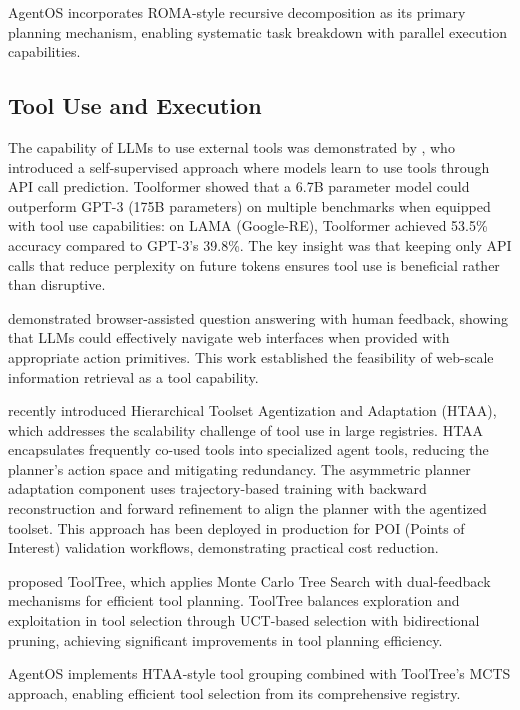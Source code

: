 \documentclass{article}
\begin{document}
AgentOS incorporates ROMA-style recursive decomposition as its primary planning mechanism, enabling systematic task breakdown with parallel execution capabilities.

\subsection{Tool Use and Execution}

The capability of LLMs to use external tools was demonstrated by \citet{schick2023toolformer}, who introduced a self-supervised approach where models learn to use tools through API call prediction. Toolformer showed that a 6.7B parameter model could outperform GPT-3 (175B parameters) on multiple benchmarks when equipped with tool use capabilities: on LAMA (Google-RE), Toolformer achieved 53.5\% accuracy compared to GPT-3's 39.8\%. The key insight was that keeping only API calls that reduce perplexity on future tokens ensures tool use is beneficial rather than disruptive.

\citet{nakano2021webgpt} demonstrated browser-assisted question answering with human feedback, showing that LLMs could effectively navigate web interfaces when provided with appropriate action primitives. This work established the feasibility of web-scale information retrieval as a tool capability.

\citet{htaa2026} recently introduced Hierarchical Toolset Agentization and Adaptation (HTAA), which addresses the scalability challenge of tool use in large registries. HTAA encapsulates frequently co-used tools into specialized agent tools, reducing the planner's action space and mitigating redundancy. The asymmetric planner adaptation component uses trajectory-based training with backward reconstruction and forward refinement to align the planner with the agentized toolset. This approach has been deployed in production for POI (Points of Interest) validation workflows, demonstrating practical cost reduction.

\citet{yang2026tooltree} proposed ToolTree, which applies Monte Carlo Tree Search with dual-feedback mechanisms for efficient tool planning. ToolTree balances exploration and exploitation in tool selection through UCT-based selection with bidirectional pruning, achieving significant improvements in tool planning efficiency.

AgentOS implements HTAA-style tool grouping combined with ToolTree's MCTS approach, enabling efficient tool selection from its comprehensive registry.
\end{document}
